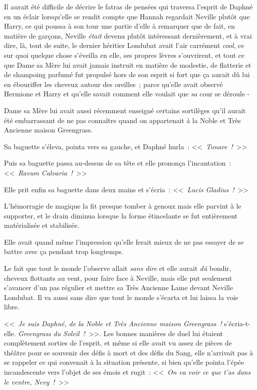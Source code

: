 Il aurait été difficile de décrire le fatras de pensées qui traversa l'esprit de Daphné en un éclair lorsqu'elle se rendit compte que Hannah regardait Neville plutôt que Harry, ce qui poussa à son tour une partie d'elle à remarquer que de fait, en matière de garçons, Neville \emph{était} devenu plutôt intéressant dernièrement, et à vrai dire, là, tout de suite, le dernier héritier Londubat avait l'air carrément \emph{cool}, ce sur quoi quelque chose s'éveilla en elle, ses propres lèvres s'ouvrirent, et tout ce que Dame sa Mère lui avait jamais instruit en matière de modestie, de flatterie et de shampoing parfumé fut propulsé hors de son esprit si fort que ça aurait dû lui en ébouriffer les cheveux autour des oreilles~; parce qu'elle avait observé Hermione et Harry et qu'elle savait comment elle voulait que \emph{sa} cour se déroule -

Dame sa Mère lui avait aussi récemment enseigné certains sortilèges qu'il aurait été embarrassant de ne pas connaître quand on appartenait à la Noble et Très Ancienne maison Greengrass.

Sa baguette s'éleva, pointa vers sa gauche, et Daphné hurla~: <<~\emph{Tonare~!}~>>

Puis sa baguette passa au-dessus de sa tête et elle prononça l'incantation~: <<~\emph{Ravum Calvaria~!}~>>

Elle prit enfin sa baguette dans deux mains et s'écria~: <<~\emph{Lucis Gladius~!}~>>

L'hémorragie de magique la fit presque tomber à genoux mais elle parvint à le supporter, et le drain diminua lorsque la forme étincelante se fut entièrement matérialisée et stabilisée.

Elle avait quand même l'impression qu'elle ferait mieux de ne pas essayer de se battre avec ça pendant trop longtemps.

Le fait que tout le monde l'observe allait \emph{sans dire} et elle aurait \emph{dû} bondir, cheveux flottants au vent, pour faire face à Neville, mais elle put seulement s'avancer d'un pas régulier et mettre sa Très Ancienne Lame devant Neville Londubat. Il va aussi sans dire que tout le monde s'écarta et lui laissa la voie libre.

<<~\emph{Je suis Daphné, de la Noble et Très Ancienne maison Greengrass~!} s'écria-t-elle. \emph{Greengrass du Soleil~!}~>>. Les bonnes manières de duel lui étaient complètement sorties de l'esprit, et même si elle avait vu assez de pièces de théâtre pour se souvenir des défis à mort et des défis du Sang, elle n'arrivait pas à se rappeler ce qui convenait à la situation présente, si bien qu'elle pointa l'épée incandescente vers l'objet de ses émois et rugit~: <<~\emph{On va voir ce que t'as dans le ventre, Nevy~!}~>>


